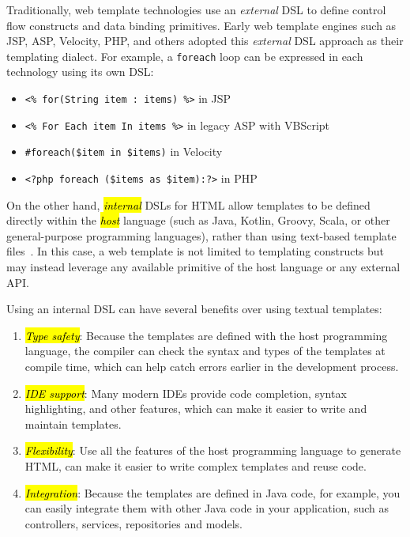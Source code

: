 \documentclass[software,article,accept,pdftex,moreauthors]{Definitions/mdpi}
\begin{document}
Traditionally, web template technologies use an \textit{external} DSL to define
control flow constructs and data binding primitives. Early web template engines
such as JSP, ASP, Velocity, PHP, and others adopted this \textit{external} DSL
approach as their templating dialect. For example, a \texttt{foreach} loop can
be expressed in each technology using its own DSL:
\begin{itemize}
  \item \texttt{<\% for(String item : items) \%>} in JSP
  \item \texttt{<\% For Each item In items \%>} in legacy ASP with VBScript
  \item \texttt{\#foreach(\$item in \$items)} in Velocity
  \item \texttt{<?php foreach (\$items as \$item):?>} in PHP
\end{itemize}

On the other hand, \textit{\hl{internal}} DSLs for HTML allow templates to be
defined directly within the \emph{\hl{host}} language (such as Java, Kotlin, Groovy,
Scala, or other general-purpose programming languages), rather than using
text-based template files~\cite{carvalho2020}. In this case, a web template
is not limited to templating constructs but may instead leverage any available
primitive of the host language or any external API.

Using an internal DSL can have several benefits over using textual templates:
\begin{enumerate}
  \item \emph{\hl{Type safety}}: Because the templates are defined with the host
        programming language, the compiler can check the syntax and types of the
        templates at compile time, which can help catch errors earlier in the
        development process.

  \item \emph{\hl{IDE support}}: Many modern IDEs provide code completion, syntax
        highlighting, and other features, which can make it easier to write and
        maintain templates.

  \item \emph{\hl{Flexibility}}: Use all the features of the host programming language
        to generate HTML, can make it easier to write complex templates and reuse code.

  \item \emph{\hl{Integration}}: Because the templates are defined in Java code, for
        example, you can easily integrate them with other Java code in your
        application, such as controllers, services, repositories and models.

\end{enumerate}
\end{document}
